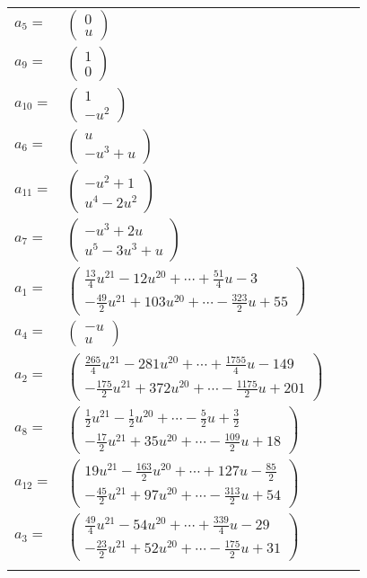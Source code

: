 \documentclass[1p]{elsarticle_modified}
\theoremstyle{definition}
\begin{document}
\begin{tabular}{m{7pt} m{180pt} m{7pt} m{180pt} }
\flushright $a_{5}=$&$\begin{pmatrix}0\\u\end{pmatrix}$ \\
\flushright $a_{9}=$&$\begin{pmatrix}1\\0\end{pmatrix}$ \\
\flushright $a_{10}=$&$\begin{pmatrix}1\\- u^2\end{pmatrix}$ \\
\flushright $a_{6}=$&$\begin{pmatrix}u\\- u^3+u\end{pmatrix}$ \\
\flushright $a_{11}=$&$\begin{pmatrix}- u^2+1\\u^4-2 u^2\end{pmatrix}$ \\
\flushright $a_{7}=$&$\begin{pmatrix}- u^3+2 u\\u^5-3 u^3+u\end{pmatrix}$ \\
\flushright $a_{1}=$&$\begin{pmatrix}\frac{13}{4} u^{21}-12 u^{20}+\cdots+\frac{51}{4} u-3\\-\frac{49}{2} u^{21}+103 u^{20}+\cdots-\frac{323}{2} u+55\end{pmatrix}$ \\
\flushright $a_{4}=$&$\begin{pmatrix}- u\\u\end{pmatrix}$ \\
\flushright $a_{2}=$&$\begin{pmatrix}\frac{265}{4} u^{21}-281 u^{20}+\cdots+\frac{1755}{4} u-149\\-\frac{175}{2} u^{21}+372 u^{20}+\cdots-\frac{1175}{2} u+201\end{pmatrix}$ \\
\flushright $a_{8}=$&$\begin{pmatrix}\frac{1}{2} u^{21}-\frac{1}{2} u^{20}+\cdots-\frac{5}{2} u+\frac{3}{2}\\-\frac{17}{2} u^{21}+35 u^{20}+\cdots-\frac{109}{2} u+18\end{pmatrix}$ \\
\flushright $a_{12}=$&$\begin{pmatrix}19 u^{21}-\frac{163}{2} u^{20}+\cdots+127 u-\frac{85}{2}\\-\frac{45}{2} u^{21}+97 u^{20}+\cdots-\frac{313}{2} u+54\end{pmatrix}$ \\
\flushright $a_{3}=$&$\begin{pmatrix}\frac{49}{4} u^{21}-54 u^{20}+\cdots+\frac{339}{4} u-29\\-\frac{23}{2} u^{21}+52 u^{20}+\cdots-\frac{175}{2} u+31\end{pmatrix}$\\&\end{tabular}
\end{document}
